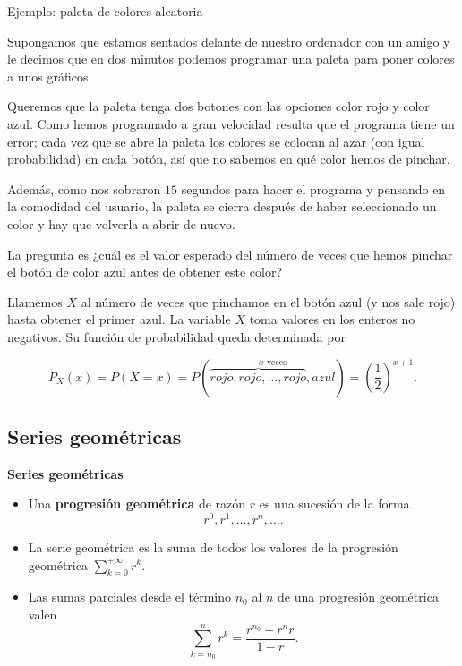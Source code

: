 \documentclass[
  letterpaper,
  DIV=11,
  numbers=noendperiod]{scrreprt}
\providecommand{\tightlist}{%
  \setlength{\itemsep}{0pt}\setlength{\parskip}{0pt}}\usepackage{longtable,booktabs,array}
\begin{document}
\begin{Ejemplo}{Ejemplo: paleta de colores aleatoria}{}

Supongamos que estamos sentados delante de nuestro ordenador con un
amigo y le decimos que en dos minutos podemos programar una paleta para
poner colores a unos gráficos.

Queremos que la paleta tenga dos botones con las opciones color rojo y
color azul. Como hemos programado a gran velocidad resulta que el
programa tiene un error; cada vez que se abre la paleta los colores se
colocan al azar (con igual probabilidad) en cada botón, así que no
sabemos en qué color hemos de pinchar.

Además, como nos sobraron \(15\) segundos para hacer el programa y
pensando en la comodidad del usuario, la paleta se cierra después de
haber seleccionado un color y hay que volverla a abrir de nuevo.

La pregunta es ¿cuál es el valor esperado del número de veces que hemos
pinchar el botón de color azul antes de obtener este color?

Llamemos \(X\) al número de veces que pinchamos en el botón azul (y nos
sale rojo) hasta obtener el primer azul. La variable \(X\) toma valores
en los enteros no negativos. Su función de probabilidad queda
determinada por

\[
P_X(x)=P(X=x)=P(\stackrel{x \mbox{ veces}}{\overbrace{rojo, rojo,\ldots,rojo},azul})
=\left(\frac12\right)^{x+1}.
\]

\end{Ejemplo}

\subsection{Series geométricas}\label{series-geomuxe9tricas}

\textbf{Series geométricas}

\begin{itemize}
\tightlist
\item
  Una \textbf{progresión geométrica} de razón \(r\) es una sucesión de
  la forma\\
  \[
  r^0, r^1,\ldots,r^n,\ldots.
  \]
\item
  La serie geométrica es la suma de todos los valores de la progresión
  geométrica \(\displaystyle\sum_{k=0}^{+\infty} r^k\).
\item
  Las sumas parciales desde el término \(n_0\) al \(n\) de una
  progresión geométrica valen \[
  \sum_{k=n_0}^n r^k=\frac{r^{n_0}- r^n r}{1-r}.
  \]
\end{itemize}
\end{document}

